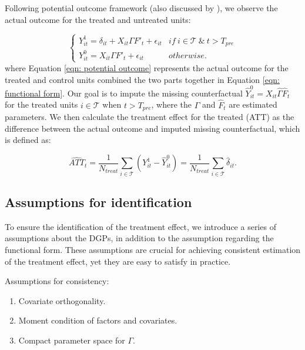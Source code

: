 \documentclass[12pt]{article}
\begin{document}
Following \cite{splawa1990application} potential outcome framework (also discussed by \cite{rubin1974estimating, rubin2005causal}), we observe the actual outcome for the treated and untreated units:

\begin{equation}
\label{eqn: potential outcome}
\begin{cases}
      Y_{it}^1 = \delta_{it} + X_{it} \Gamma F'_t + \epsilon_{it} & if \ i \in \mathcal{T} \ \& \ t > T_{pre} \\
      Y_{it}^0 = X_{it} \Gamma F'_t + \epsilon_{it} & otherwise.
\end{cases}
\end{equation}
where Equation \ref{eqn: potential outcome} represents the actual outcome for the treated and control units combined the two parts together in Equation \ref{eqn: functional form}. Our goal is to impute the missing counterfactual $\hat{Y}_{it}^0 = X_{it} \hat{\Gamma} \hat{F}_t$ for the treated units $i \in \mathcal{T}$ when $t > T_{pre}$, where the $\hat{\Gamma}$ and $\hat{F}_t$ are estimated parameters. We then calculate the treatment effect for the treated (ATT) as the difference between the actual outcome and imputed missing counterfactual, which is defined as:

\begin{equation}
\widehat{ATT}_{t} = \frac{1}{N_{treat}}\sum_{i \in \mathcal{T}} \left( Y_{it}^1 - \hat{Y}_{it}^0 \right) = \frac{1}{N_{treat}}\sum_{i \in \mathcal{T}}\hat{\delta}_{it}.
\end{equation}
\subsection{Assumptions for identification}

To ensure the identification of the treatment effect, we introduce a series of assumptions about the DGPs, in addition to the assumption regarding the functional form. These assumptions are crucial for achieving consistent estimation of the treatment effect, yet they are easy to satisfy in practice.

\begin{assumption}
\label{ass: consistency}
Assumptions for consistency:
\begin{enumerate}
\item Covariate orthogonality.
\item Moment condition of factors and covariates.
\item Compact parameter space for $\Gamma$. 
\end{enumerate}
\end{assumption}
\end{document}
